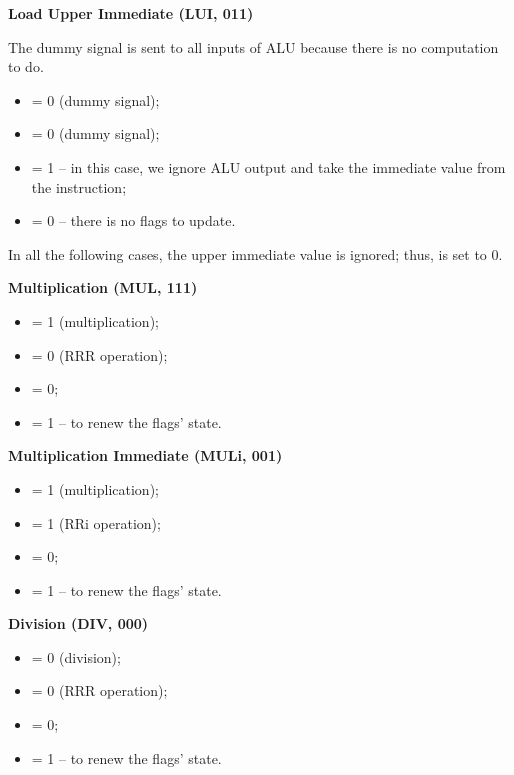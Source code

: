 \textbf{Load Upper Immediate (LUI, 011)}

The dummy signal is sent to all inputs of ALU because there is no computation to do.

\begin{itemize}
    \setlength\itemsep{2pt}
    \item {} = 0 (dummy signal);
    \item {} = 0 (dummy signal);
    \item {} = 1 -- in this case, we ignore ALU output and take the immediate value from the instruction;
    \item {} = 0 -- there is no flags to update.
\end{itemize}

In all the following cases, the upper immediate value is ignored; thus,  is set to 0.

\textbf{Multiplication (MUL, 111)}
\begin{itemize}
    \setlength\itemsep{2pt}
    \item {} = 1 (multiplication);
    \item {} = 0 (RRR operation);
    \item {} = 0;
    \item {} = 1 -- to renew the flags' state.
\end{itemize}

\textbf{Multiplication Immediate (MULi, 001)}
\begin{itemize}
    \setlength\itemsep{2pt}
    \item {} = 1 (multiplication);
    \item {} = 1 (RRi operation);
    \item {} = 0;
    \item {} = 1 -- to renew the flags' state.
\end{itemize}

\textbf{Division (DIV, 000)}
\begin{itemize}
    \setlength\itemsep{2pt}
    \item {} = 0 (division);
    \item {} = 0 (RRR operation);
    \item {} = 0;
    \item {} = 1 -- to renew the flags' state.
\end{itemize}
    
